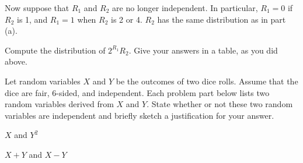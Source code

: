 \documentclass[11pt, twoside]{article}
\begin{document}
\begin{problems}
{}

\ppart%
Now suppose that $R_1$ and $R_2$ are no longer independent.
In particular, $R_1 = 0$ if $R_2$ is 1, and $R_1 =1$ when $R_2$ is 2 or 4.
$R_2$ has the same distribution as in part (a).

Compute the distribution of $2^{R_1} R_2$. Give your answers in a table, as you did above.


\eparts


\problem  {} %
Let random variables $X$ and $Y$ be the
outcomes of two dice rolls.  Assume that the dice are fair, 6-sided,
and independent.  Each problem part below lists two random variables
derived from $X$ and $Y$.  State whether or not these two random
variables are independent and briefly sketch a justification for your
answer.

\begin{problemparts}
\problempart $X$ and $Y ^ 2$


\problempart $X + Y$ and $X - Y$

\end{problemparts}
\end{problems}
\end{document}
